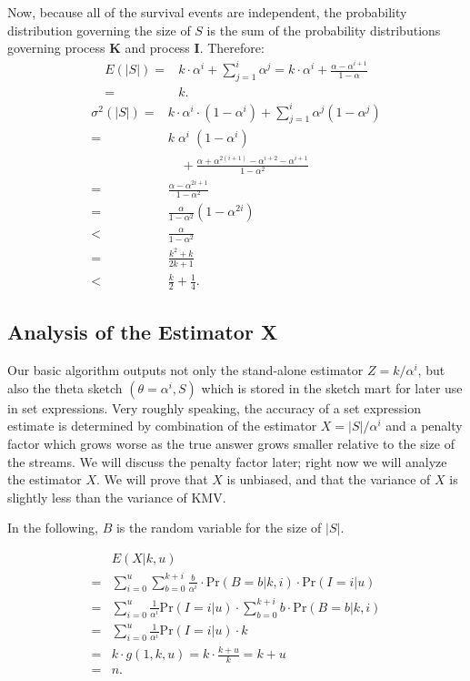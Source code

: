 \documentclass{sig-alternate}
\begin{document}
Now, because all of the survival events are independent, the probability distribution governing the
size of $S$ is the sum of the probability distributions governing process {\bf K} and process {\bf I}.
Therefore:
\begin{align}
E(|S|) = & k \cdot \alpha^i + \sum_{j=1}^{i} \alpha^j 
       = k \cdot \alpha^i + \frac{\alpha - \alpha^{i+1}}{1 - \alpha} \\
       = & k.     
\end{align}
\begin{align}
\sigma^2(|S|) = & k \cdot \alpha^i \cdot (1 - \alpha^i) + \sum_{j=1}^{i} \alpha^j (1 -\alpha^j) \\
              = & k \;\alpha^i \;(1 - \alpha^i) \\
                & \quad + \frac{\alpha + \alpha^{2(i+1)} - \alpha^{i+2} - \alpha^{i+1}}{1 - \alpha^2} \\
             = & \frac{\alpha - \alpha^{2i+1}}{1 - \alpha^2} \\
             = & \frac{\alpha}{1-\alpha^2}(1-\alpha^{2i}) \\
             < & \frac{\alpha}{1-\alpha^2} \\
             = & \frac{k^2+k}{2k+1} \\
             < & \frac{k}{2} + \frac{1}{4}.
\end{align}

\subsection{Analysis of the Estimator X}

Our basic algorithm outputs not only the stand-alone estimator $Z = k
/ \alpha^i$, but also the theta sketch $(\theta = \alpha^i, S)$ which
is stored in the sketch mart for later use in set expressions. Very
roughly speaking, the accuracy of a set expression estimate is
determined by combination of the estimator $X = |S| / \alpha^i$ and a
penalty factor which grows worse as the true answer grows smaller
relative to the size of the streams. We will discuss the penalty
factor later; right now we will analyze the estimator $X$. We will
prove that $X$ is unbiased, and that the variance of $X$ is slightly
less than the variance of KMV.

In the following, $B$ is the random variable for the size of $|S|$.

\begin{align}
 & E(X | k, u)  \\
= & \sum_{i=0}^u \sum_{b=0}^{k+i}
\frac{b}{\alpha^i} \cdot \mathrm{Pr}(B \!=\! b | k, i) \cdot
\mathrm{Pr}(I \!=\! i | u) \\
= &\sum_{i=0}^u \frac{1}{\alpha^i} \mathrm{Pr}(I \!=\! i | u) \cdot 
\sum_{b=0}^{k+i} b \cdot \mathrm{Pr}(B \!=\! b | k, i) \\
= & \sum_{i=0}^u \frac{1}{\alpha^i} \mathrm{Pr}(I \!=\! i | u) \cdot k \\
= & k \cdot g(1,k,u) = k \cdot \frac{k+u}{k} = k + u \\
= & n.
\end{align}
\end{document}
